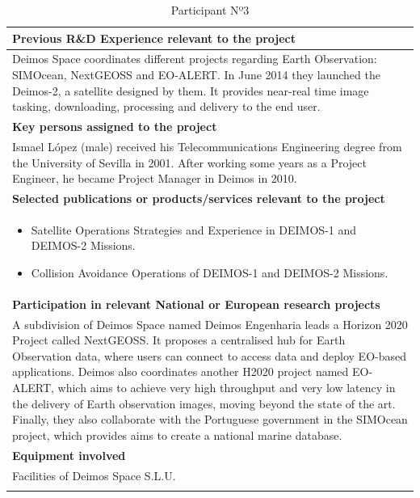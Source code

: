 \begin{longtable}[H]{|p{0.7cm}|p{4cm}|p{7cm}|p{1.3cm}|}
	\multicolumn{4}{|p{13cm}|}{\textbf{Previous R\&D Experience relevant to the project}}  \\ \hline
	
	\multicolumn{4}{|p{14.5cm}|}{Deimos Space coordinates different projects regarding Earth Observation: SIMOcean, NextGEOSS and EO-ALERT. In June 2014 they launched the Deimos-2, a satellite designed by them. It provides near-real time image tasking, downloading, processing and delivery to the end user.}  \\ \hline
	
	\multicolumn{4}{|p{13cm}|}{\textbf{Key persons assigned to the project}}   \\ \hline
	
	\multicolumn{4}{|p{14.5cm}|}{Ismael López (male) received his Telecommunications Engineering degree from the University of Sevilla in 2001. After working some years as a Project Engineer, he became Project Manager in Deimos in 2010. }  \\ \hline
	
	\multicolumn{4}{|p{13cm}|}{\textbf{Selected publications or products/services relevant to the project}}  \\ \hline
	
	\multicolumn{4}{|p{14.5cm}|}{
	\begin{itemize}
		\item \vspace{-0.5cm}Satellite Operations Strategies and Experience in DEIMOS-1 and DEIMOS-2 Missions.
		\item Collision Avoidance Operations of DEIMOS-1 and DEIMOS-2 Missions.\vspace{-0.3cm}
	\end{itemize}	}  \\ \hline
	
	\multicolumn{4}{|p{13cm}|}{\textbf{Participation in relevant National or European research projects}}  \\ \hline
	
	\multicolumn{4}{|p{14.5cm}|}{A subdivision of Deimos Space named Deimos Engenharia leads a Horizon 2020 Project called NextGEOSS. It proposes a centralised hub for Earth Observation data, where users can connect to access data and deploy EO-based applications. Deimos also coordinates another H2020 project named EO-ALERT, which aims to achieve very high throughput and very low latency in the delivery of Earth observation images, moving beyond the state of the art. Finally, they also collaborate with the Portuguese government in the SIMOcean project, which provides aims to create a national marine database.}  \\ \hline
	
	\multicolumn{4}{|p{13cm}|}{\textbf{Equipment involved}}  \\ \hline
	
	\multicolumn{4}{|p{14.5cm}|}{Facilities of Deimos Space S.L.U.}  \\ \hline
	\caption{Participant Nº3}
\end{longtable}



